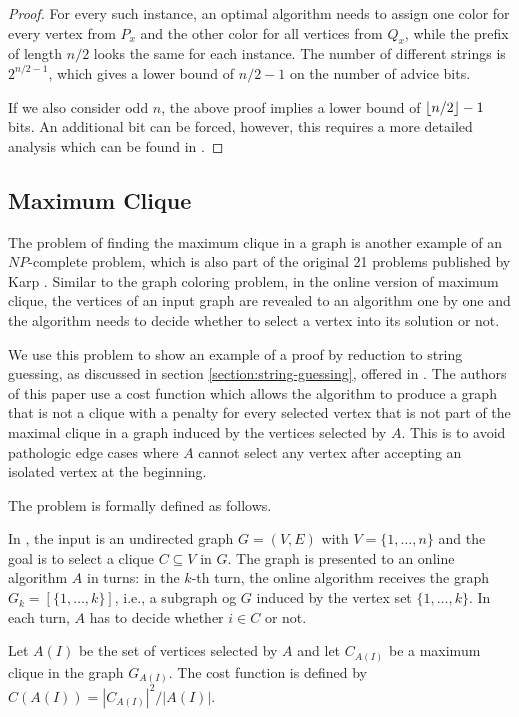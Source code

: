 \begin{proof}
    For every such instance, an optimal algorithm needs to assign one
    color for every vertex from $P_x$ and the other color for all vertices
    from $Q_x$, while the prefix of length $n/2$ looks the same for each
    instance. The number of different strings is $2^{n/2-1}$, which gives
    a lower bound of $n/2-1$ on the number of advice bits.

    If we also consider odd $n$, the above proof implies a lower bound of
    $\lfloor n/2\rfloor-1$ bits. An additional bit can be forced, however, this
    requires a more detailed analysis which can be found in
    \cite{misof-trivial-graphs}.
\end{proof}

\subsection{Maximum Clique}

The problem of finding the maximum clique in a graph is another example of
an $NP$-complete problem, which is also part of the original 21 problems
published by Karp \cite{karp-np}. Similar to the graph coloring problem,
in the online version of maximum clique, the vertices of an input graph
are revealed to an algorithm one by one and the algorithm needs to decide
whether to select a vertex into its solution or not.

We use this problem to show an example of a proof by reduction to string
guessing, as discussed in section \ref{section:string-guessing}, offered in
\cite{string-guessing}. The authors of this paper use a cost function
which allows the algorithm to produce a graph that is not a clique with a
penalty for every selected vertex that is not part of the maximal clique
in a graph induced by the vertices selected by $A$. This is to avoid
pathologic edge cases where $A$ cannot select any vertex after accepting
an isolated vertex at the beginning.

The problem is formally defined as follows.

\begin{definition}\label{definition:max-clique}
    In , the input is an undirected graph $G = (V, E)$
    with $V = \{1, \dots, n\}$ and the goal is to select a clique $C
    \subseteq V$ in $G$. The graph is presented to an online algorithm $A$
    in turns: in the $k$-th turn, the online algorithm receives the graph
    $G_k = [\{1, \dots, k\}]$, i.e., a subgraph og $G$ induced by the
    vertex set $\{1, \dots, k\}$. In each turn, $A$ has to decide whether
    $i \in C$ or not.

    Let $A(I)$ be the set of vertices selected by $A$ and let $C_{A(I)}$
    be a maximum clique in the graph $G_{A(I)}$. The cost function is
    defined by $C(A(I)) = |C_{A(I)}|^2 / |A(I)|$.
\end{definition}

